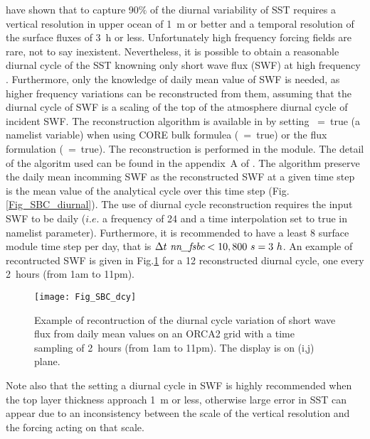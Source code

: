 \documentclass[NEMO_book]{subfiles}
\begin{document}
\cite{Bernie_al_JC05} have shown that to capture 90$\%$ of the diurnal variability of 
SST requires a vertical resolution in upper ocean of 1~m or better and a temporal resolution 
of the surface fluxes of 3~h or less. Unfortunately high frequency forcing fields are rare, 
not to say inexistent. Nevertheless, it is possible to obtain a reasonable diurnal cycle 
of the SST knowning only short wave flux (SWF) at high frequency \citep{Bernie_al_CD07}.
Furthermore, only the knowledge of daily mean value of SWF is needed, 
as higher frequency variations can be reconstructed from them, assuming that 
the diurnal cycle of SWF is a scaling of the top of the atmosphere diurnal cycle 
of incident SWF. The \cite{Bernie_al_CD07} reconstruction algorithm is available
in \NEMO by setting ~=~true (a \textit{} namelist variable) when using 
CORE bulk formulea (~=~true) or the flux formulation (~=~true). 
The reconstruction is performed in the  module. The detail of the algoritm used 
can be found in the appendix~A of \cite{Bernie_al_CD07}. The algorithm preserve the daily 
mean incomming SWF as the reconstructed SWF at a given time step is the mean value 
of the analytical cycle over this time step (Fig.\ref{Fig_SBC_diurnal}). 
The use of diurnal cycle reconstruction requires the input SWF to be daily 
($i.e.$ a frequency of 24 and a time interpolation set to true in  namelist parameter).
Furthermore, it is recommended to have a least 8 surface module time step per day,
that is  $\rdt \ \np{nn\_fsbc} < 10,800~s = 3~h$. An example of recontructed SWF 
is given in Fig.\ref{Fig_SBC_dcy} for a 12 reconstructed diurnal cycle, one every 2~hours 
(from 1am to 11pm).

\begin{figure}[!t]  \begin{center}
\texttt{[image: Fig\_SBC\_dcy]}
\caption{ \label{Fig_SBC_dcy}   
Example of recontruction of the diurnal cycle variation of short wave flux  
from daily mean values on an ORCA2 grid with a time sampling of 2~hours (from 1am to 11pm). 
The display is on (i,j) plane. }
\end{center}   \end{figure}

Note also that the setting a diurnal cycle in SWF is highly recommended  when 
the top layer thickness approach 1~m or less, otherwise large error in SST can 
appear due to an inconsistency between the scale of the vertical resolution 
and the forcing acting on that scale.
\end{document}
